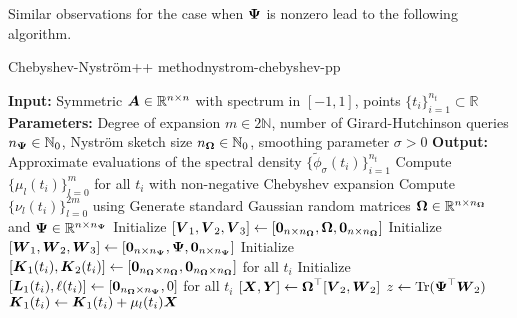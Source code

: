 Similar observations for the case when $\boldsymbol{\Psi}$ is nonzero lead to the following algorithm.

\begin{algo}{Chebyshev-Nyström++ method}{nystrom-chebyshev-pp}
\begin{algorithmic}[1]
    \Statex \textbf{Input:} Symmetric $\boldsymbol{A} \in \mathbb{R}^{n \times n}$ with spectrum in $[-1, 1]$, points $\{t_i\}_{i=1}^{n_t} \subset \mathbb{R}$
    \Statex \textbf{Parameters:} Degree of expansion $m \in 2\mathbb{N}$, number of Girard-Hutchinson queries $n_{\boldsymbol{\Psi}} \in \mathbb{N}_0$, Nyström sketch size $n_{\boldsymbol{\Omega}} \in \mathbb{N}_0$,  smoothing parameter $\sigma > 0$
    \Statex \textbf{Output:} Approximate evaluations of the spectral density $\{\widetilde{\phi}_{\sigma}(t_i)\}_{i=1}^{n_t}$
    \State Compute $\{\mu_l(t_i)\}_{l=0}^{m}$ for all $t_i$ with non-negative Chebyshev expansion 
    \State Compute $\{\nu_l(t_i)\}_{l=0}^{2m}$ using %
    \State Generate standard Gaussian random matrices $\boldsymbol{\Omega} \in \mathbb{R}^{n \times n_{\boldsymbol{\Omega}}}$ and $\boldsymbol{\Psi} \in \mathbb{R}^{n \times n_{\boldsymbol{\Psi}}}$%
    \State Initialize $[\boldsymbol{V}_1, \boldsymbol{V}_2, \boldsymbol{V}_3] \gets [\boldsymbol{0}_{n \times n_{\boldsymbol{\Omega}}}, \boldsymbol{\boldsymbol{\Omega}}, \boldsymbol{0}_{n \times n_{\boldsymbol{\Omega}}}]$
    \State Initialize $[\boldsymbol{W}_1, \boldsymbol{W}_2, \boldsymbol{W}_3] \gets [\boldsymbol{0}_{n \times n_{\boldsymbol{\Psi}}}, \boldsymbol{\Psi}, \boldsymbol{0}_{n \times n_{\boldsymbol{\Psi}}}]$
    \State Initialize $[\boldsymbol{K}_1(t_i), \boldsymbol{K}_2(t_i)] \gets [\boldsymbol{0}_{n_{\boldsymbol{\Omega}} \times n_{\boldsymbol{\Omega}}}, \boldsymbol{0}_{n_{\boldsymbol{\Omega}} \times n_{\boldsymbol{\Omega}}}]$ for all $t_i$
    \State Initialize $[\boldsymbol{L}_1(t_i), \ell(t_i)] \gets [\boldsymbol{0}_{n_{\boldsymbol{\Omega}} \times n_{\boldsymbol{\Psi}}}, 0]$ for all $t_i$
    \State $[\boldsymbol{X}, \boldsymbol{Y}] \gets \boldsymbol{\boldsymbol{\Omega}}^{\top} [\boldsymbol{V}_2, \boldsymbol{W}_2]$  
      \State $z \gets \operatorname{Tr}(\boldsymbol{\Psi}^{\top} \boldsymbol{W}_2)$
            \State $\boldsymbol{K}_1(t_i) \gets \boldsymbol{K}_1(t_i) + \mu_l(t_i) \boldsymbol{X}$ 

\end{algorithmic}
\end{algo}
